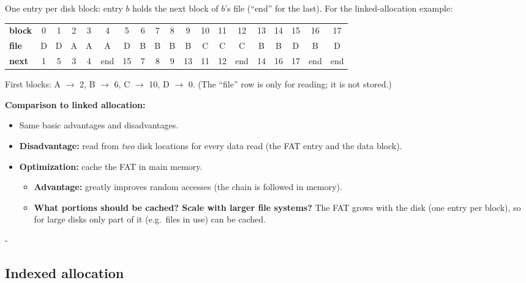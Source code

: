 \documentclass[11pt,a4paper]{article}
\makeatletter
\newcommand{\keepspace}[1]{\par\penalty-100\begingroup
  \setlength{\dimen@}{#1}\dimen@ii\pagegoal\advance\dimen@ii-\pagetotal
  \ifdim\dimen@>\dimen@ii\ifdim\dimen@ii>\z@\vfil\fi\break\fi\endgroup}
\makeatother
\begin{document}
\begin{quizbox}
One entry per disk block: entry \(b\) holds the next block of \(b\)'s file
(``end'' for the last). For the linked-allocation example:

\smallskip
\begin{center}
\footnotesize
\setlength{\tabcolsep}{2.6pt}
\renewcommand{\arraystretch}{1.25}
\begin{tabular}{@{}l*{18}{c}@{}}
  \toprule
  \textbf{block} & 0 & 1 & 2 & 3 & 4 & 5 & 6 & 7 & 8 & 9 & 10 & 11 & 12 & 13 & 14 & 15 & 16 & 17 \\
  \textbf{file}  & D & D & A & A & A & D & B & B & B & B & C & C & C & B & B & D & B & D \\
  \midrule
  \textbf{next}  & 1 & 5 & 3 & 4 & end & 15 & 7 & 8 & 9 & 13 & 11 & 12 & end & 14 & 16 & 17 & end & end \\
  \bottomrule
\end{tabular}
\end{center}

\smallskip
First blocks: A \(\to\) 2, B \(\to\) 6, C \(\to\) 10, D \(\to\) 0. (The
``file'' row is only for reading; it is not stored.)
\end{quizbox}

\noindent\textbf{Comparison to linked allocation:}
\begin{itemize}
  \item Same basic advantages and disadvantages.
  \item \textbf{Disadvantage:} read from \emph{two} disk locations for every
        data read (the FAT entry and the data block).
  \item \textbf{Optimization:} cache the FAT in main memory.
  \begin{itemize}
    \item \textbf{Advantage:} greatly improves random accesses (the chain
          is followed in memory).
    \item \textbf{What portions should be cached? Scale with larger file
          systems?} The FAT grows with the disk (one entry per block), so
          for large disks only part of it (e.g.\ files in use) can be
          cached.
  \end{itemize}
\end{itemize}

\keepspace{8\baselineskip}
\subsection{Indexed allocation}
\end{document}
